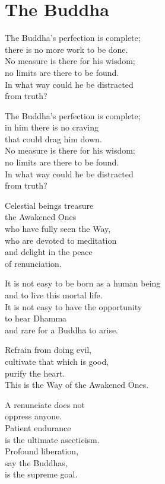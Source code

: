 
\chapter{The Buddha}


The Buddha's perfection is complete;\\
there is no more work to be done.\\
No measure is there for his wisdom;\\
no limits are there to be found.\\
In what way could he be distracted\\
from truth?


The Buddha's perfection is complete;\\
in him there is no craving\\
that could drag him down.\\
No measure is there for his wisdom;\\
no limits are there to be found.\\
In what way could he be distracted\\
from truth?


Celestial beings treasure\\
the Awakened Ones\\
who have fully seen the Way,\\
who are devoted to meditation\\
and delight in the peace\\
of renunciation.


It is not easy to be born as a human being\\
and to live this mortal life.\\
It is not easy to have the opportunity\\
to hear Dhamma\\
and rare for a Buddha to arise.


Refrain from doing evil,\\
cultivate that which is good,\\
purify the heart.\\
This is the Way of the Awakened Ones.


A renunciate does not\\
oppress anyone.\\
Patient endurance\\
is the ultimate asceticism.\\
Profound liberation,\\
say the Buddhas,\\
is the supreme goal.


